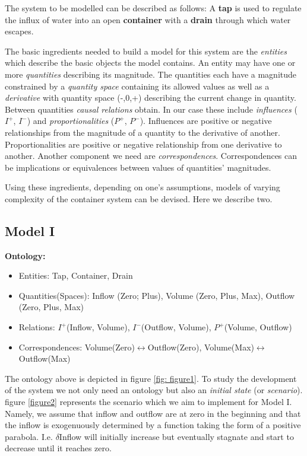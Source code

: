 \documentclass{article}
\begin{document}
The system to be modelled can be described as follows: A \textbf{tap} is used to regulate the influx of water into an open \textbf{container} with a \textbf{drain} through which water escapes.

The basic ingredients needed to build a model for this system are the \textit{entities} which describe the basic objects the model contains. An entity may have one or more \textit{quantities} describing its magnitude. The quantities each have a magnitude constrained by a \textit{quantity space} containing its allowed values as well as a \textit{derivative} with quantity space (-,0,+) describing the current change in quantity. Between quantities \textit{causal relations} obtain. In our case these include \textit{influences} ($I^+$, $I^-$) and \textit{proportionalities} ($P^+$, $P^-$). Influences are positive or negative relationships from the magnitude of a quantity to the derivative of another. Proportionalities are positive or negative relationship from one derivative to another.
Another component we need are \textit{correspondences}. Correspondences can be implications or equivalences between values of quantities' magnitudes.

Using these ingredients, depending on one's assumptions, models of varying complexity of the container system can be devised. Here we describe two. 

\subsection {Model I}

\textbf{Ontology:}
\begin{itemize}
	\item Entities: Tap, Container, Drain
	\item Quantities(Spaces): Inflow (Zero; Plus), Volume (Zero, Plus, Max), Outflow (Zero, Plus, Max)
	\item Relations: $I^+$(Inflow, Volume), $I^-$(Outflow, Volume), $P^+$(Volume, Outflow)
	\item Correspondences: Volume(Zero)$\leftrightarrow$Outflow(Zero), Volume(Max)$\leftrightarrow$Outflow(Max)
\end{itemize}

The ontology above is depicted in figure \ref{fig: figure1}. To study the development of the system we not only need an ontology but also an \textit{initial state} (or \textit{scenario}). figure \ref{figure2} represents the scenario which we aim to implement for Model I. Namely, we assume that inflow and outflow are at zero in the beginning and that the inflow is exogenuously determined by a function taking the form of a positive parabola. I.e. $\delta$Inflow will initially increase but eventually stagnate and start to decrease until it reaches zero.
\end{document}
